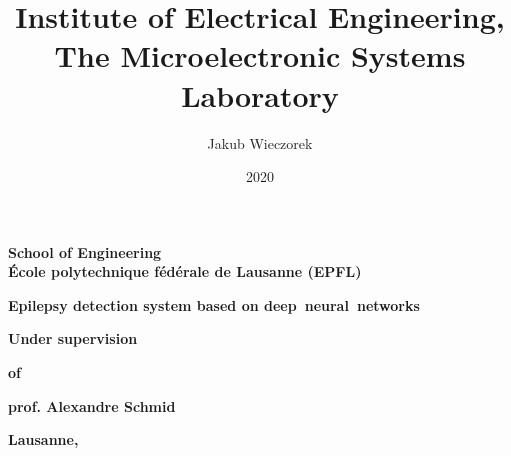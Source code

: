 \documentclass[a4paper,titlepage,11pt,twosides,floatssmall]{mwrep}
\begin{document}
	
	\frenchspacing
	\makeatletter
	\def\ps@uheadings{%
		\let\@mkboth\markboth
		\let\ps@normal\hf@uheadings
		\let\ps@opening\hf@plain
		\let\ps@closing\hf@uheadings
		\let\ps@blank\hf@empty
		\ps@normal
		\def\chaptermark##1{%
			\markright{%
				\ifHeadingNumbered
				\thechapter.\enspace
				\fi
				##1}}}
	
	\pagestyle{uheadings}
	
	\title{\bf Institute of Electrical Engineering,\\
The Microelectronic Systems Laboratory\vskip 0.1cm}
	\author{Jakub Wieczorek}

	\date{2020}
	
	\makeatletter
	\renewcommand{\maketitle}{\begin{titlepage}
			\begin{center}{\LARGE {\bf
						School of Engineering}}\\
				\vspace{0.4cm}
				{\LARGE {\bf École polytechnique fédérale de Lausanne (EPFL)}}\\
				\vspace{0.3cm}
			\end{center}
			\vspace{5cm}
			\begin{center}
				{\bf \LARGE Epilepsy detection system based on deep~neural~networks\vskip 0.1cm}
			\end{center}
			\vspace{1cm}
			\begin{center}
				{\bf \LARGE \@title}
			\end{center}
			\vspace{2cm}
			\begin{center}
				{\bf \Large \@author \par}
			\end{center}
			\vspace{2cm}
			\begin{center}
			{\bf \large Under supervision \par}
			\vspace{0.5cm}
			{\bf \large of
			\par}
			\vspace{0.5cm}
			{\bf \large 
			prof. Alexandre Schmid\par}
			\end{center}
			\vspace*{\stretch{6}}
			\begin{center}
				\bf{\large{Lausanne, \@date\vskip 0.1cm}}
			\end{center}
		\end{titlepage}
	}

	\makeatother
	
	\newcommand{\at}[2][]{#1|_{#2}}
	
	\maketitle
	
	\tableofcontents
	\setcounter{page}{2}
	
	
	
    
	
	\listoffigures

\end{document}
